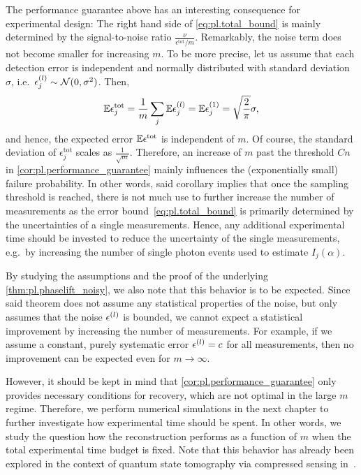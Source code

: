 The performance guarantee above has an interesting consequence for experimental design:
The right hand side of \cref{eq:pl.total_bound} is mainly determined by the signal-to-noise ratio $\frac{\nu}{\epsilon^\mathrm{tot} / m}$.
Remarkably, the noise term does not become smaller for increasing $m$.
To be more precise, let us assume that each detection error  is independent and normally distributed with standard deviation $\sigma$, i.e.\ $\epsilon^{(l)}_j \sim \mathcal{N}(0, \sigma^2)$.
Then,
\[
  \mathbb{E} \epsilon^\mathrm{tot}_j = \frac{1}{m} \sum_j \mathbb{E} \epsilon^{(l)}_j = \mathbb{E} \epsilon^{(1)}_j = \sqrt{\frac{2}{\pi}} \sigma,
\]
and hence, the expected error $\mathbb{E} \epsilon^\mathrm{tot}$ is independent of $m$.
Of course, the standard deviation of $\epsilon^\mathrm{tot}_j$ scales as $\frac{1}{\sqrt{m}}$.
Therefore, an increase of $m$ past the threshold $Cn$ in \cref{cor:pl.performance_guarantee} mainly influences the (exponentially small) failure probability.
In other words, said corollary implies that once the sampling threshold is reached, there is not much use to further increase the number of measurements as the error bound~\eqref{eq:pl.total_bound} is primarily determined by the uncertainties of a single measurements.
Hence, any additional experimental time should be invested to reduce the uncertainty of the single measurements, e.g.\ by increasing the number of single photon events used to estimate $I_j(\alpha)$.

By studying the assumptions and the proof of the underlying \cref{thm:pl.phaselift_noisy}, we also note that this behavior is to be expected.
Since said theorem does not assume any statistical properties of the noise, but only assumes that the noise $\epsilon^{(l)}$ is bounded, we cannot expect a statistical improvement by increasing the number of measurements.
For example, if we assume a constant, purely systematic error $\epsilon^{(l)} = c$ for all measurements, then no improvement can be expected even for $m\to\infty$.

However, it should be kept in mind that \cref{cor:pl.performance_guarantee} only provides necessary conditions for recovery, which are not optimal in the large $m$ regime.
Therefore, we perform numerical simulations in the next chapter to further investigate how experimental time should be spent.
In other words, we study the question how the reconstruction performs as a function of $m$ when the total experimental time budget is fixed.
Note that this behavior has already been explored in the context of quantum state tomography via compressed sensing in~\cite{Flammia_2012_Quantum}.


